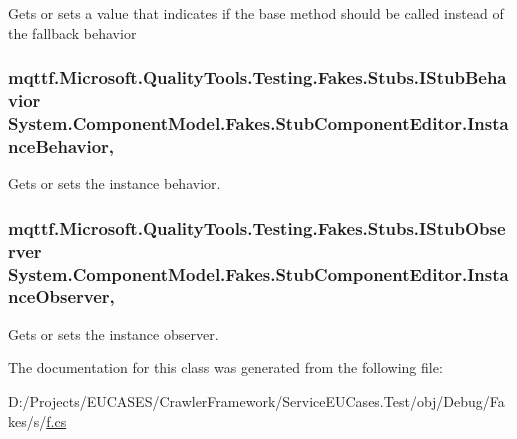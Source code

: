 Gets or sets a value that indicates if the base method should be called instead of the fallback behavior

\hypertarget{class_system_1_1_component_model_1_1_fakes_1_1_stub_component_editor_a486595374f699d2542defd11538ba933}{
\subsubsection[{Instance\-Behavior}]{\setlength{\rightskip}{0pt plus 5cm}mqttf.\-Microsoft.\-Quality\-Tools.\-Testing.\-Fakes.\-Stubs.\-I\-Stub\-Behavior System.\-Component\-Model.\-Fakes.\-Stub\-Component\-Editor.\-Instance\-Behavior\hspace{0.3cm}{\ttfamily [get]}, {\ttfamily [set]}}}\label{class_system_1_1_component_model_1_1_fakes_1_1_stub_component_editor_a486595374f699d2542defd11538ba933}


Gets or sets the instance behavior.

\hypertarget{class_system_1_1_component_model_1_1_fakes_1_1_stub_component_editor_ae1f66908292c6db27c2338c340090f94}{
\subsubsection[{Instance\-Observer}]{\setlength{\rightskip}{0pt plus 5cm}mqttf.\-Microsoft.\-Quality\-Tools.\-Testing.\-Fakes.\-Stubs.\-I\-Stub\-Observer System.\-Component\-Model.\-Fakes.\-Stub\-Component\-Editor.\-Instance\-Observer\hspace{0.3cm}{\ttfamily [get]}, {\ttfamily [set]}}}\label{class_system_1_1_component_model_1_1_fakes_1_1_stub_component_editor_ae1f66908292c6db27c2338c340090f94}


Gets or sets the instance observer.



The documentation for this class was generated from the following file\-:\begin{DoxyCompactItemize}
\item 
D\-:/\-Projects/\-E\-U\-C\-A\-S\-E\-S/\-Crawler\-Framework/\-Service\-E\-U\-Cases.\-Test/obj/\-Debug/\-Fakes/s/\hyperlink{s_2f_8cs}{f.\-cs}\end{DoxyCompactItemize}
